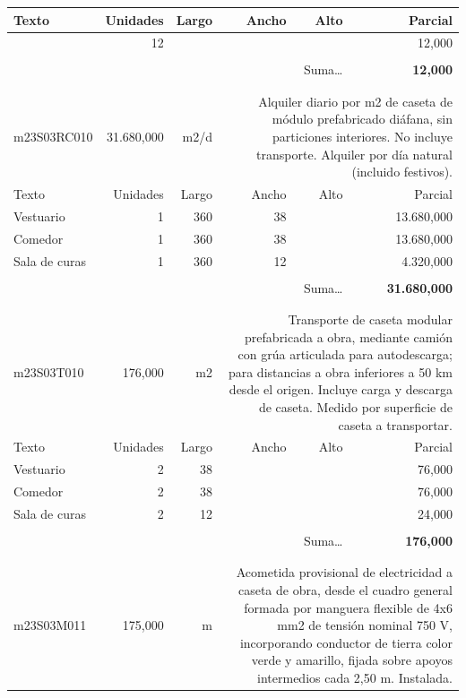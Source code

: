 \documentclass{book}%
\begin{document}
\begin{longtable}{lrrrrr}
Texto&Unidades&Largo&Ancho&Alto&Parcial\\%
\hline%
\multicolumn{1}{p{3.5cm}}{ }&12&&&&    12,000\\%
&&&&&\\%
\multicolumn{5}{r}{Suma\ldots}&\textbf{    12,000}\\%
\hline%
&&&&&\\%
&&&&&\\%
m23S03RC010&31.680,000& m2/d&\multicolumn{3}{p{6cm}}{\scriptsize Alquiler diario por m2 de caseta de módulo prefabricado diáfana, sin particiones interiores. No incluye transporte. Alquiler por día natural (incluido festivos).\normalsize}\\%
Texto&Unidades&Largo&Ancho&Alto&Parcial\\%
\hline%
\multicolumn{1}{p{3.5cm}}{Vestuario}&1&360&38&&13.680,000\\%
\multicolumn{1}{p{3.5cm}}{Comedor}&1&360&38&&13.680,000\\%
\multicolumn{1}{p{3.5cm}}{Sala de curas}&1&360&12&& 4.320,000\\%
&&&&&\\%
\multicolumn{5}{r}{Suma\ldots}&\textbf{31.680,000}\\%
\hline%
&&&&&\\%
&&&&&\\%
m23S03T010&   176,000& m2&\multicolumn{3}{p{6cm}}{\scriptsize Transporte de caseta modular prefabricada a obra, mediante camión con grúa articulada para autodescarga; para distancias a obra inferiores a 50 km desde el origen. Incluye carga y descarga de caseta. Medido por superficie de caseta a transportar.\normalsize}\\%
Texto&Unidades&Largo&Ancho&Alto&Parcial\\%
\hline%
\multicolumn{1}{p{3.5cm}}{Vestuario}&2&38&&&    76,000\\%
\multicolumn{1}{p{3.5cm}}{Comedor}&2&38&&&    76,000\\%
\multicolumn{1}{p{3.5cm}}{Sala de curas}&2&12&&&    24,000\\%
&&&&&\\%
\multicolumn{5}{r}{Suma\ldots}&\textbf{   176,000}\\%
\hline%
&&&&&\\%
&&&&&\\%
m23S03M011&   175,000& m&\multicolumn{3}{p{6cm}}{\scriptsize Acometida provisional de electricidad a caseta de obra, desde el cuadro general formada por manguera flexible de 4x6 mm2 de tensión nominal 750 V, incorporando conductor de tierra color verde y amarillo, fijada sobre apoyos intermedios cada 2,50 m. Instalada.\normalsize}\\%

\end{longtable}
\end{document}
